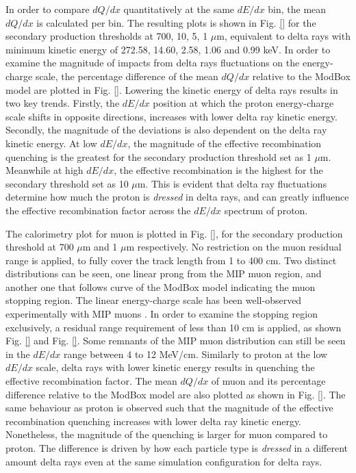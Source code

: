 In order to compare $dQ/dx$ quantitatively at the same $dE/dx$ bin, the mean $dQ/dx$ is calculated per bin.
The resulting plots is shown in Fig. \ref{} for the secondary production thresholds at 700, 10, 5, 1 $\mu$m, equivalent to delta rays with minimum kinetic energy of 272.58, 14.60, 2.58, 1.06 and 0.99 keV.
In order to examine the magnitude of impacts from delta rays fluctuations on the energy-charge scale, the percentage difference of the mean $dQ/dx$ relative to the ModBox model are plotted in Fig. \ref{}.
Lowering the kinetic energy of delta rays results in two key trends.
Firstly, the $dE/dx$ position at which the proton energy-charge scale shifts in opposite directions, increases with lower delta ray kinetic energy. 
Secondly, the magnitude of the deviations is also dependent on the delta ray kinetic energy. 
At low $dE/dx$, the magnitude of the effective recombination quenching is the greatest for the secondary production threshold set as 1 $\mu$m. 
Meanwhile at high $dE/dx$, the effective recombination is the highest for the secondary threshold set as 10 $\mu$m. 
This is evident that delta ray fluctuations determine how much the proton is \textit{dressed} in delta rays, and can greatly influence the effective recombination factor across the $dE/dx$ spectrum of proton. 

The calorimetry plot for muon is plotted in Fig. \ref{}, for the secondary production threshold at 700 $\mu$m and 1 $\mu$m respectively.
No restriction on the muon residual range is applied, to fully cover the track length from 1 to 400 cm.
Two distinct distributions can be seen, one linear prong from the MIP muon region, and another one that follows curve of the ModBox model indicating the muon stopping region. 
The linear energy-charge scale has been well-observed experimentally with MIP muons \cite{}.
In order to examine the stopping region exclusively, a residual range requirement of less than 10 cm is applied, as shown Fig. \ref{} and Fig. \ref{}. 
Some remnants of the MIP muon distribution can still be seen in the $dE/dx$ range between 4 to 12 MeV/cm. 
Similarly to proton at the low $dE/dx$ scale, delta rays with lower kinetic energy results in quenching the effective recombination factor. 
The mean $dQ/dx$ of muon and its percentage difference relative to the ModBox model are also plotted as shown in Fig. \ref{}.
The same behaviour as proton is observed such that the magnitude of the effective recombination quenching increases with lower delta ray kinetic energy.
Nonetheless, the magnitude of the quenching is larger for muon compared to proton.
The difference is driven by how each particle type is \textit{dressed} in a different amount delta rays even at the same simulation configuration for delta rays.

